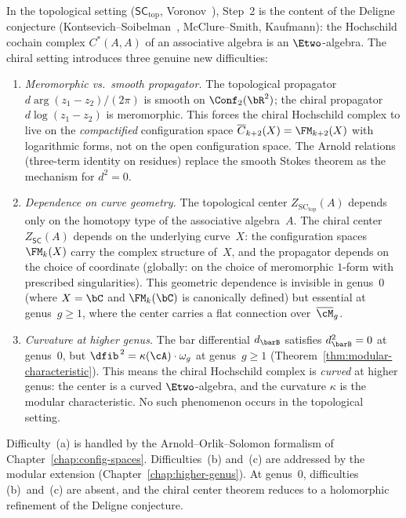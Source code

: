 \begin{remark}
\label{rem:chiral-spectral-parameter-difficulty}
In the topological setting ($\mathsf{SC}_{\mathrm{top}}$,
Voronov~\cite{Voronov99}), Step~2 is the content of the Deligne
conjecture
(Kontsevich--Soibelman~\cite{KS00},
McClure--Smith, Kaufmann):
the Hochschild cochain complex $C^*(A, A)$ of an associative
algebra is an $\Etwo$-algebra. The chiral setting introduces three
genuine new difficulties:
\begin{enumerate}[label=\textup{(\alph*)}]
\item \emph{Meromorphic vs.\ smooth propagator.} The topological
 propagator $d\arg(z_1 - z_2)/(2\pi)$ is smooth on
 $\Conf_2(\bR^2)$; the chiral propagator
 $d\log(z_1 - z_2)$ is meromorphic. This forces the chiral
 Hochschild complex to live on the \emph{compactified}
 configuration space $\overline{C}_{k+2}(X) = \FM_{k+2}(X)$ with
 logarithmic forms, not on the open configuration space. The
 Arnold relations (three-term identity on residues) replace the
 smooth Stokes theorem as the mechanism for $d^2 = 0$.
\item \emph{Dependence on curve geometry.} The topological
 center $Z_{\mathrm{SC_{top}}}(A)$ depends only on the
 homotopy type of the associative algebra~$A$. The chiral center
 $Z_{\mathsf{SC}}(A)$ depends on the underlying curve~$X$: the
 configuration spaces $\FM_k(X)$ carry the complex structure
 of~$X$, and the propagator depends on the choice of coordinate
 (globally: on the choice of meromorphic $1$-form with prescribed
 singularities). This geometric dependence is invisible in
 genus~$0$ (where $X = \bC$ and $\FM_k(\bC)$ is canonically
 defined) but essential at genus~$g \geq 1$, where the center
 carries a flat connection over~$\overline{\cM}_g$.
\item \emph{Curvature at higher genus.} The bar differential
 $d_{\barB}$ satisfies $d_{\barB}^2 = 0$ at genus~$0$, but
 $\dfib^{\,2} = \kappa(\cA) \cdot \omega_g$ at genus~$g \geq 1$
 (Theorem~\ref{thm:modular-characteristic}). This means the
 chiral Hochschild complex is \emph{curved} at higher genus:
 the center is a curved $\Etwo$-algebra, and the curvature
 $\kappa$ is the modular characteristic. No such phenomenon
 occurs in the topological setting.
\end{enumerate}
Difficulty~(a) is handled by the Arnold--Orlik--Solomon formalism
of Chapter~\ref{chap:config-spaces}. Difficulties~(b)
and~(c) are addressed by the modular extension
(Chapter~\ref{chap:higher-genus}). At genus~$0$, difficulties
(b)~and~(c) are absent, and the chiral center theorem reduces to a
holomorphic refinement of the Deligne conjecture.
\end{remark}


